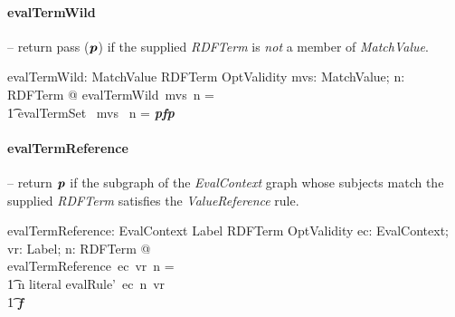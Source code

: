 \documentclass[fuzz]{llncs}
\def\pass{\textbf{\textit{p}}}
\def\fail{\textbf{\textit{f}}}
\def\zc{\textit}
\begin{document}
\paragraph{evalTermWild} -- return pass ($\pass$) if the supplied \zc{RDFTerm} is \textit{not} a member of \zc{MatchValue}.

\begin{gendef}
   evalTermWild: \power MatchValue \fun RDFTerm \fun OptValidity
\where
   \forall mvs: \power MatchValue; n: RDFTerm @ evalTermWild~mvs~n = \\
\t1 \IF evalTermSet~ mvs~ n = \pass \THEN \fail \ELSE \pass
\end{gendef}

\paragraph{evalTermReference} -- return $\pass$ if the subgraph of the \zc{EvalContext} graph whose subjects match the supplied \zc{RDFTerm} satisfies the \zc{ValueReference} rule.

\begin{gendef}
   evalTermReference: EvalContext \pfun Label \pfun RDFTerm \pfun OptValidity
\where
	\forall ec: EvalContext; vr: Label; n: RDFTerm @ \\ evalTermReference~ec~vr~n = \\
\t1 \IF n \notin \ran literal \THEN evalRule'~ec~n~vr \\
\t1 \ELSE \fail
\end{gendef}
\end{document}
